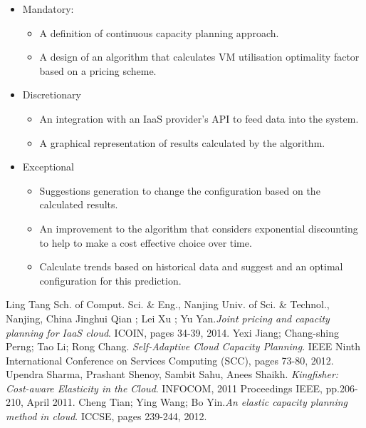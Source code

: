 \documentclass[11pt]{artikel3}
\begin{document}
\begin{itemize}
\item Mandatory:
\begin{itemize}
\item A definition of continuous capacity planning approach.
\item A design of an algorithm that calculates VM utilisation optimality factor based on a pricing scheme.
\end{itemize}

\item Discretionary
\begin{itemize}
\item An integration with an IaaS provider's API to feed data into the system.
\item A graphical representation of results calculated by the algorithm.
\end{itemize}

\item Exceptional
\begin{itemize}
\item Suggestions generation to change the configuration based on the calculated results.
\item An improvement to the algorithm that considers exponential discounting to help to make a cost effective choice over time.
\item Calculate trends based on historical data and suggest and an optimal configuration for this prediction.
\end{itemize}
\end{itemize}

\begin{thebibliography}{50}
 Ling Tang Sch. of Comput. Sci. \& Eng., Nanjing Univ. of Sci. \& Technol., Nanjing, China Jinghui Qian ; Lei Xu ; Yu Yan.\textsl{Joint pricing and capacity planning for IaaS cloud}. ICOIN, pages 34-39, 2014.
  Yexi Jiang; Chang-shing Perng; Tao Li; Rong Chang. \textsl{Self-Adaptive Cloud Capacity Planning}. IEEE Ninth International Conference on Services Computing (SCC), pages 73-80, 2012.
 Upendra Sharma, Prashant Shenoy, Sambit Sahu, Anees Shaikh. \textsl{Kingfisher: Cost-aware Elasticity in the Cloud}. INFOCOM, 2011 Proceedings IEEE, pp.206-210, April 2011.
 Cheng Tian; Ying Wang; Bo Yin.\textsl{An elastic capacity planning method in cloud}. ICCSE, pages 239-244, 2012.
\end{thebibliography}
\end{document}
